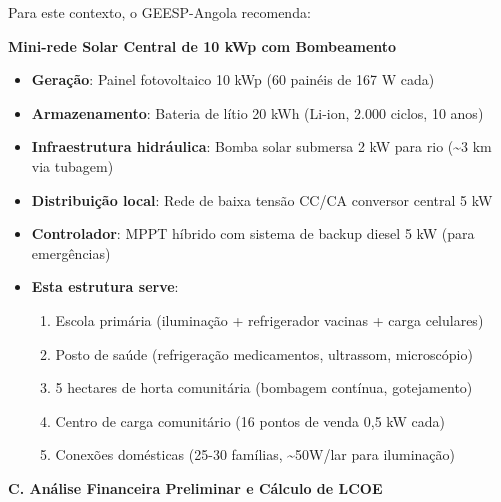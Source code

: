 \documentclass[12pt, a4paper]{article}
\begin{document}
Para este contexto, o GEESP-Angola recomenda:

\textbf{Mini-rede Solar Central de 10 kWp com Bombeamento}

\begin{itemize}
\item \textbf{Geração}: Painel fotovoltaico 10 kWp (60 painéis de 167 W cada)
\item \textbf{Armazenamento}: Bateria de lítio 20 kWh (Li-ion, 2.000 ciclos, 10 anos)
\item \textbf{Infraestrutura hidráulica}: Bomba solar submersa 2 kW para rio (\textasciitilde{}3 km via tubagem)
\item \textbf{Distribuição local}: Rede de baixa tensão CC/CA conversor central 5 kW
\item \textbf{Controlador}: MPPT híbrido com sistema de backup diesel 5 kW (para emergências)
\item \textbf{Esta estrutura serve}:
  \begin{enumerate}
  \item Escola primária (iluminação + refrigerador vacinas + carga celulares)
  \item Posto de saúde (refrigeração medicamentos, ultrassom, microscópio)
  \item 5 hectares de horta comunitária (bombagem contínua, gotejamento)
  \item Centro de carga comunitário (16 pontos de venda 0,5 kW cada)
  \item Conexões domésticas (25-30 famílias, \textasciitilde{}50W/lar para iluminação)
  \end{enumerate}
\end{itemize}

\textbf{C. Análise Financeira Preliminar e Cálculo de LCOE}
\end{document}
